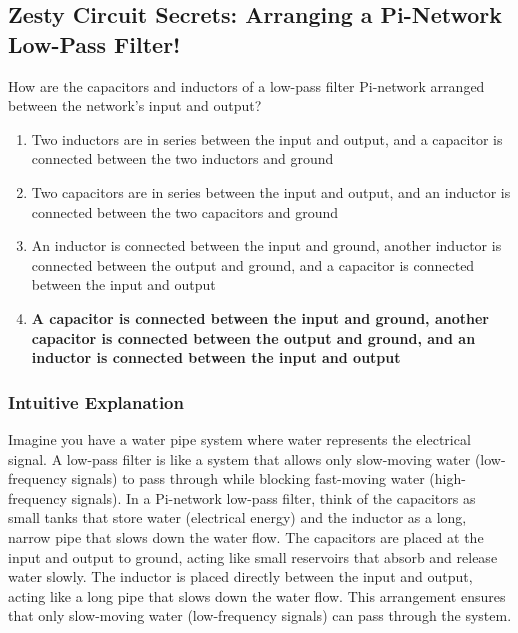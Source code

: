 \subsection{Zesty Circuit Secrets: Arranging a Pi-Network Low-Pass Filter!}

\begin{tcolorbox}[colback=gray!10!white,colframe=black!75!black,title=E7C01] How are the capacitors and inductors of a low-pass filter Pi-network arranged between the network’s input and output?
    \begin{enumerate}[label=\Alph*,noitemsep]
        \item Two inductors are in series between the input and output, and a capacitor is connected between the two inductors and ground
        \item Two capacitors are in series between the input and output, and an inductor is connected between the two capacitors and ground
        \item An inductor is connected between the input and ground, another inductor is connected between the output and ground, and a capacitor is connected between the input and output
        \item \textbf{A capacitor is connected between the input and ground, another capacitor is connected between the output and ground, and an inductor is connected between the input and output}
    \end{enumerate}
\end{tcolorbox}

\subsubsection{Intuitive Explanation}
Imagine you have a water pipe system where water represents the electrical signal. A low-pass filter is like a system that allows only slow-moving water (low-frequency signals) to pass through while blocking fast-moving water (high-frequency signals). In a Pi-network low-pass filter, think of the capacitors as small tanks that store water (electrical energy) and the inductor as a long, narrow pipe that slows down the water flow. The capacitors are placed at the input and output to ground, acting like small reservoirs that absorb and release water slowly. The inductor is placed directly between the input and output, acting like a long pipe that slows down the water flow. This arrangement ensures that only slow-moving water (low-frequency signals) can pass through the system.

